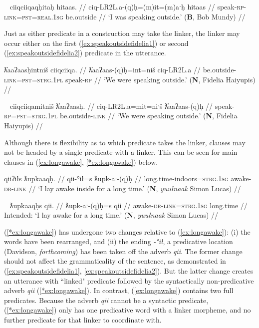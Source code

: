 \ex~ \label{ex:speakoutsidebob2}
\begingl
\glpreamble ciiqciiqaqḥitaḥ hitaas. //
\gla ciq-LR2L.a-(q)ḥ=(m)it=(m)aˑḥ  hitaas  //
\glb speak-\textsc{rp}-\textsc{link}=\textsc{pst}=\textsc{real.1sg} be.outside //
\glft `I was speaking outside.' (\textbf{B}, Bob Mundy) //
\endgl
\xe

Just as either predicate in a construction may take the linker, the linker may occur either on the first (\ref{ex:speakoutsidefidelia1}) or second (\ref{ex:speakoutsidefidelia2}) predicate in the utterance.

\ex \label{ex:speakoutsidefidelia1}
\begingl
\glpreamble ƛ̓aaʔaasḥintniš ciiqciiqa. //
\gla ƛ̓aaʔaas-(q)ḥ=int=niš ciq-LR2L.a //
\glb be.outside-\textsc{link}=\textsc{pst}=\textsc{strg.1pl} speak-\textsc{rp} //
\glft `We were speaking outside.' (\textbf{N}, Fidelia Haiyupis) //
\endgl
\xe

\ex~ \label{ex:speakoutsidefidelia2}
\begingl
\glpreamble ciiqciiqamitniš ƛ̓aaʔaasḥ. //
\gla ciq-LR2L.a=mit=niˑš ƛ̓aaʔaas-(q)ḥ //
\glb speak-\textsc{rp}=\textsc{pst}=\textsc{strg.1pl} be.outside-\textsc{link} //
\glft `We were speaking outside.' (\textbf{N}, Fidelia Haiyupis) //
\endgl
\xe

Although there is flexibility as to which predicate takes the linker, clauses may not be headed by a single predicate with a linker. This can be seen for main clauses in (\ref{ex:longawake}, \ref{*ex:longawake}) below.

\ex \label{ex:longawake}
\begingl
\glpreamble qiiʔiłs ƛupkaaqḥ. //
\gla qii-°ił=s ƛupk-aˑ-(q)ḥ //
\glb long.time-indoors=\textsc{strg.1sg} awake-\textsc{dr}-\textsc{link} //
\glft `I lay awake inside for a long time.' (\textbf{N}, \textit{yuułnaak} Simon Lucas) //
\endgl
\xe

\ex~ \label{*ex:longawake}
\begingl
\glpreamble *ƛupkaaqḥs qii. //
\gla ƛupk-aˑ-(q)ḥ=s qii //
\glb awake-\textsc{dr}-\textsc{link}=\textsc{strg.1sg} long.time //
\glft Intended: `I lay awake for a long time.' (\textbf{N}, \textit{yuułnaak} Simon Lucas) //
\endgl
\xe

(\ref{*ex:longawake}) has undergone two changes relative to (\ref{ex:longawake}): (i) the words have been rearranged, and (ii) the ending \textit{-°ił}, a predicative location (Davidson, \textit{forthcoming}) has been taken off the adverb \textit{qii}. The former change should not affect the grammaticality of the sentence, as demonstrated in (\ref{ex:speakoutsidefidelia1}, \ref{ex:speakoutsidefidelia2}). But the latter change creates an utterance with ``linked" predicate followed by the syntactically non-predicative adverb \textit{qii} (\ref{*ex:longawake}). In contrast, (\ref{ex:longawake}) contains two full predicates. Because the adverb \textit{qii} cannot be a syntactic predicate, (\ref{*ex:longawake}) only has one predicative word with a linker morpheme, and no further predicate for that linker to coordinate with.


